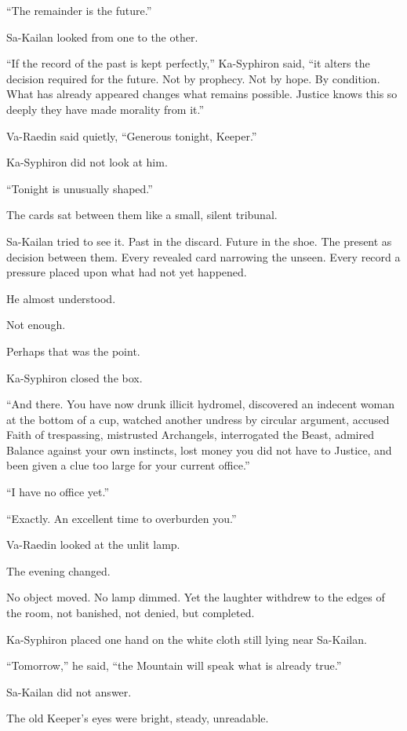 “The remainder is the future.”\par
Sa-Kailan looked from one to the other.\par
“If the record of the past is kept perfectly,” Ka-Syphiron said, “it alters the decision required for the future. Not by prophecy. Not by hope. By condition. What has already appeared changes what remains possible. Justice knows this so deeply they have made morality from it.”\par
Va-Raedin said quietly, “Generous tonight, Keeper.”\par
Ka-Syphiron did not look at him.\par
“Tonight is unusually shaped.”\par
The cards sat between them like a small, silent tribunal.\par
Sa-Kailan tried to see it. Past in the discard. Future in the shoe. The present as decision between them. Every revealed card narrowing the unseen. Every record a pressure placed upon what had not yet happened.\par
He almost understood.\par
Not enough.\par
Perhaps that was the point.\par
Ka-Syphiron closed the box.\par
“And there. You have now drunk illicit hydromel, discovered an indecent woman at the bottom of a cup, watched another undress by circular argument, accused Faith of trespassing, mistrusted Archangels, interrogated the Beast, admired Balance against your own instincts, lost money you did not have to Justice, and been given a clue too large for your current office.”\par
“I have no office yet.”\par
“Exactly. An excellent time to overburden you.”\par
Va-Raedin looked at the unlit lamp.\par
The evening changed.\par
No object moved. No lamp dimmed. Yet the laughter withdrew to the edges of the room, not banished, not denied, but completed.\par
Ka-Syphiron placed one hand on the white cloth still lying near Sa-Kailan.\par
“Tomorrow,” he said, “the Mountain will speak what is already true.”\par
Sa-Kailan did not answer.\par
The old Keeper’s eyes were bright, steady, unreadable.\par
